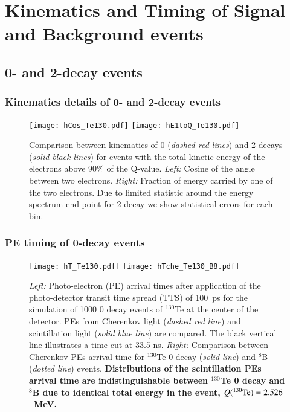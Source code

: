 \section{Kinematics and Timing of Signal and Background events}


\subsection{0\nbb- and 2\nbb-decay events}
\subsubsection{Kinematics details of 0\nbb- and 2\nbb-decay events}

\begin{figure*}[ht]
  \centering
  \texttt{[image: hCos\_Te130.pdf]}
  \texttt{[image: hE1toQ\_Te130.pdf]}
  \caption{Comparison between kinematics of 0{\nbb} (\emph{dashed red
      lines}) and 2{\nbb} decays (\emph{solid black lines}) for events
    with the total kinetic energy of the electrons above 90\% of the
    Q-value. \emph{Left:} Cosine of the angle between two
    electrons. \emph{Right:} Fraction of energy carried by one of the
    two electrons. Due to limited statistic around the energy spectrum
    end point for 2{\nbb} decay we show statistical errors for each
    bin.}
  \label{fig:Kinematics}
\end{figure*}

\subsubsection{PE timing of 0\nbb-decay events}

\begin{figure*}[ht]
  \centering
  \texttt{[image: hT\_Te130.pdf]}
  \texttt{[image: hTche\_Te130\_B8.pdf]}
  \caption{\emph{Left:} Photo-electron (PE) arrival times after
    application of the photo-detector transit time spread (TTS) of
    100~ps for the simulation of 1000 0{\nbb} decay events of
    $^{130}$Te at the center of the detector. PEs from Cherenkov light
    (\emph{dashed red line}) and scintillation light (\emph{solid blue
      line}) are compared. The black vertical line illustrates a time
    cut at 33.5 ns. \emph{Right:} Comparison between Cherenkov PEs
    arrival time for $^{130}$Te {0\nbb} decay (\emph{solid line}) and
    $^{8}$B (\emph{dotted line}) events. {\bf Distributions of the
      scintillation PEs arrival time are indistinguishable between
      $^{130}$Te 0{\nbb} decay and $^8$B due to identical total energy
      in the event, $Q(^{130}{\rm Te})=2.526$~MeV.} }
\label{fig:ArrivalTimeDist}
\end{figure*}


